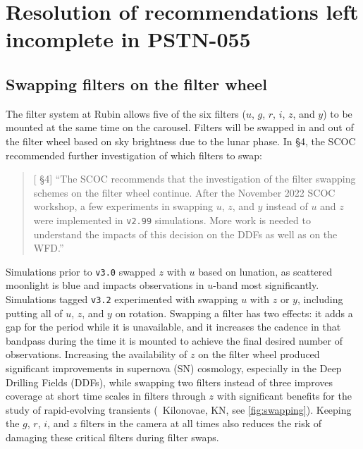
\clearpage

\section{Resolution of recommendations left incomplete in PSTN-055} \label{sec:openquestions}

\subsection{Swapping filters on the filter wheel}\label{sec:filterswap}
The filter system at Rubin allows five of the six filters ($u$, $g$, $r$, $i$, $z$, and $y$) to be mounted at the same time on the carousel. 
Filters will be swapped in and out of the filter wheel based on sky brightness due to the lunar phase. 
In  \S4, the SCOC recommended further investigation of which filters to swap: 
\begin{quote}
    {[ \S4] ``The SCOC recommends that the investigation of the filter swapping schemes on the filter wheel continue. After the November 2022 SCOC workshop, a few experiments in swapping $u$, $z$, and $y$ instead of $u$ and $z$ were implemented in \texttt{v2.99} simulations. More work is needed to understand the impacts of this decision on the DDFs as well as on the WFD.''}
\end{quote}

 Simulations prior to \texttt{v3.0} swapped $z$ with $u$ based on lunation, as scattered moonlight is blue and impacts observations in $u$-band most significantly. Simulations tagged \texttt{v3.2}  experimented with  swapping $u$ with $z$ or $y$, including putting all of $u$, $z$, and $y$ on rotation. Swapping a filter has two effects: it adds a gap for the period while it is unavailable, and it increases the cadence in that bandpass during the time it is mounted to achieve the final desired number of observations. Increasing the availability of $z$ on the filter wheel produced significant improvements in supernova (SN) cosmology, especially in the Deep Drilling Fields (DDFs), while swapping two filters instead of three improves coverage at short time scales in filters through $z$ with significant benefits for the study of rapid-evolving transients (\eg\ Kilonovae, KN, see \autoref{fig:swapping}). Keeping the $g$, $r$, $i$, and $z$ filters in the camera at all times also reduces the risk of damaging these critical filters during filter swaps.
 
